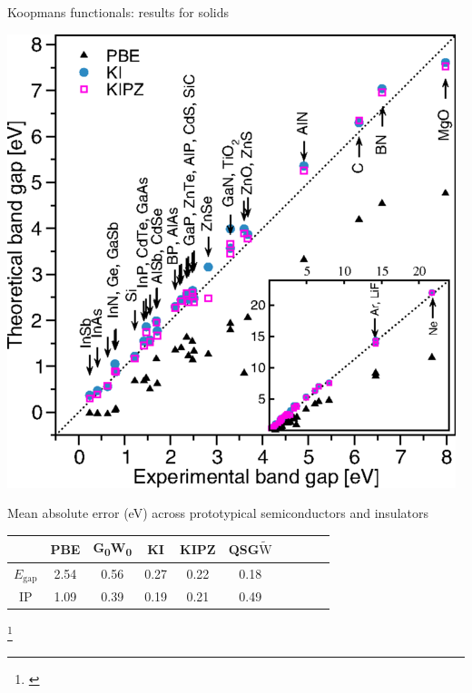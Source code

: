 \documentclass[xcolor=table,aspectratio=169]{beamer}
\newcommand\blfootcite[1]{%
  \begingroup
  \renewcommand\thefootnote{}\footnote{\hspace{-4ex}\cite{#1}}%
  \addtocounter{footnote}{-1}%
  \endgroup
}
\numberwithin{equation}{section}
\begin{document}
\begin{frame}{Koopmans functionals: results for solids}
   \begin{minipage}[c]{0.35\textwidth}
      \includegraphics[width=\textwidth]{figures/fig_nguyen_prx_bandgaps.png}
   \end{minipage}
   \hspace{1em}
   \begin{minipage}[c]{0.6\textwidth}

      \footnotesize
      Mean absolute error (eV) across prototypical semiconductors and insulators

      \vspace{1ex}
      \begin{tabular}{c S[table-format = 2.2] S[table-format = 2.2] S[table-format = 2.2] S[table-format = 2.2] S[table-format = 2.2] S[table-format = 2.2] S[table-format = 2.2] S[table-format = 2.2] S[table-format = 2.2]}
                          & {PBE} & {G\textsubscript{0}W\textsubscript{0}} & {KI} & {KIPZ} & {QSG$\tilde{\mathrm{W}}$} \\
         \midrule
         \midrule
         $E_\mathrm{gap}$ & 2.54  & 0.56                                   & 0.27 & 0.22   & 0.18                      \\
         \midrule
         IP               & 1.09  & 0.39                                   & 0.19 & 0.21   & 0.49                      \\
      \end{tabular}
   \end{minipage}

   \blfootcite{Nguyen2018}
\end{frame}
\end{document}

